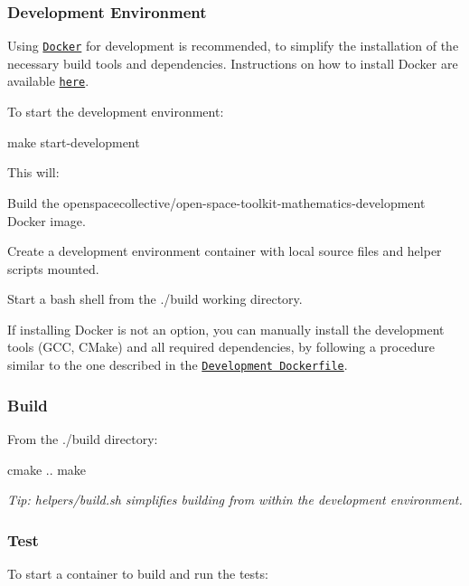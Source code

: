 \subsubsection*{Development Environment}

Using \href{https://www.docker.com}{\tt Docker} for development is recommended, to simplify the installation of the necessary build tools and dependencies. Instructions on how to install Docker are available \href{https://docs.docker.com/install/}{\tt here}.

To start the development environment\+:


\begin{DoxyCode}
make start-development
\end{DoxyCode}


This will\+:


\begin{DoxyEnumerate}
\item Build the {\ttfamily openspacecollective/open-\/space-\/toolkit-\/mathematics-\/development} Docker image.
\item Create a development environment container with local source files and helper scripts mounted.
\item Start a {\ttfamily bash} shell from the {\ttfamily ./build} working directory.
\end{DoxyEnumerate}

If installing Docker is not an option, you can manually install the development tools (G\+CC, C\+Make) and all required dependencies, by following a procedure similar to the one described in the \href{./docker/development/Dockerfile}{\tt Development Dockerfile}.

\subsubsection*{Build}

From the {\ttfamily ./build} directory\+:


\begin{DoxyCode}
cmake ..
make
\end{DoxyCode}


{\itshape Tip\+: {\ttfamily helpers/build.\+sh} simplifies building from within the development environment.}

\subsubsection*{Test}

To start a container to build and run the tests\+:


